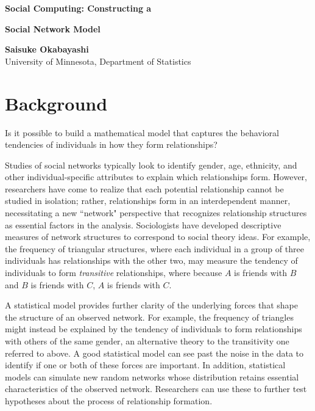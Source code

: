 \documentclass[12pt]{article}
\begin{document}
\begin{center}
{\LARGE{\textbf{Social Computing: Constructing a}}} 

\vspace*{2mm}
{\LARGE{\textbf{Social Network Model}}}

\vspace{0.25in}
{\large{\textbf{Saisuke Okabayashi}}} \\
\vspace{0.05in}
{\large{{University of Minnesota, Department of Statistics}}}\\
\end{center}


\section{Background}
Is it possible to build a mathematical model that captures the behavioral tendencies of individuals in how they form relationships?

Studies of social networks typically look to identify gender, age, ethnicity, and other individual-specific attributes to explain which relationships form.  However, researchers have come to realize that each potential relationship cannot be studied in isolation; rather, relationships form in an interdependent manner, necessitating a new ``network" perspective that recognizes relationship structures as essential factors in the analysis.  
Sociologists have developed descriptive measures of network structures to correspond to social theory ideas.  For example, the frequency of triangular structures, where each individual in a group of three individuals has relationships with the other two, may measure the tendency of individuals to form \textit{transitive} relationships, where because $A$ is friends with $B$ and $B$ is friends with $C$, $A$ is friends with $C$.  %

A statistical model provides further clarity of the underlying forces that shape the structure of an observed network.   
For example, the frequency of triangles might instead be explained by the tendency of individuals to form relationships with others of the same gender, an alternative theory to the transitivity one referred to above.  A good statistical model can see past the noise in the data to identify if one or both of these forces are important.   
In addition, statistical models can simulate new random networks whose distribution retains essential characteristics of the observed network.  Researchers can use these to further test hypotheses about the process of relationship formation.  
\end{document}
